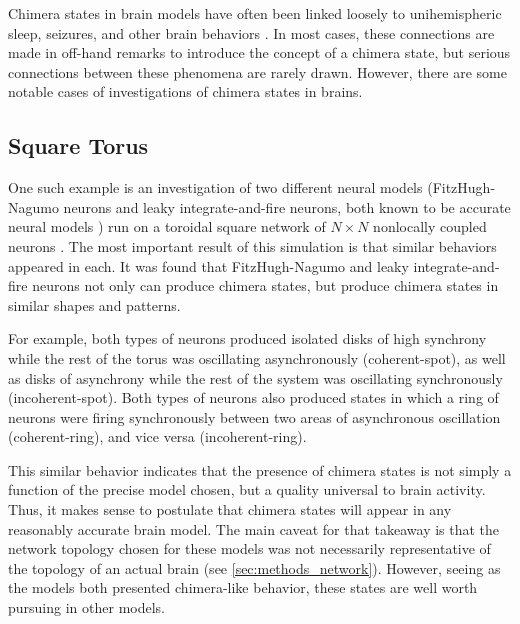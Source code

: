 Chimera states in brain models have often been linked loosely to
unihemispheric sleep,
seizures,
and other brain behaviors \cite{Abrams2008,Panaggio2015,Martens2013,Abrams2004,Shanahan2010}.
In most cases,
these connections are made in off-hand remarks to introduce the concept of a chimera state,
but serious connections between these phenomena are rarely drawn.
However,
there are some notable cases of investigations of chimera states in brains.

\subsection{Square Torus}
\label{sec:lit_review_chimera_square_torus}
One such example is an investigation of two different neural models
(FitzHugh-Nagumo neurons and leaky integrate-and-fire neurons, both known to be accurate neural models \cite{Deco2008})
run on a toroidal square network of $N \times N$ nonlocally coupled neurons \cite{Schmidt2017}.
The most important result of this simulation is that similar behaviors appeared in each.
It was found that FitzHugh-Nagumo and leaky integrate-and-fire neurons not only can produce chimera states,
but produce chimera states in similar shapes and patterns.

For example,
both types of neurons produced isolated disks of high synchrony while the rest of the torus was oscillating asynchronously (coherent-spot),
as well as disks of asynchrony while the rest of the system was oscillating synchronously (incoherent-spot).
Both types of neurons also produced states in which a ring of neurons were firing synchronously
between two areas of asynchronous oscillation (coherent-ring),
and vice versa (incoherent-ring).

This similar behavior indicates that the presence of chimera states is not simply a function of the precise model chosen,
but a quality universal to brain activity.
Thus, it makes sense to postulate that chimera states will appear in any reasonably accurate brain model.
The main caveat for that takeaway is that the network topology chosen for these models was not necessarily representative of the topology of an actual brain (see \cref{sec:methods_network}).
However, seeing as the models both presented chimera-like behavior,
these states are well worth pursuing in other models.

